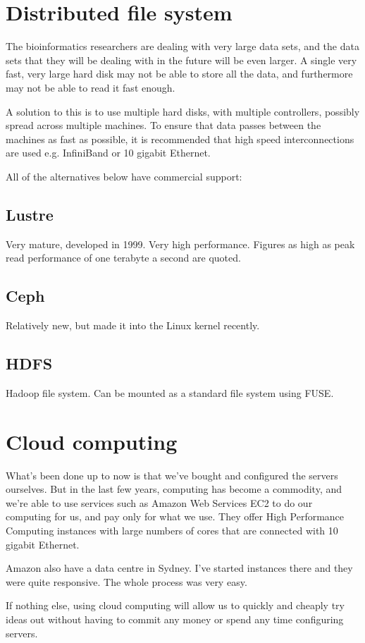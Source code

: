 \documentclass{amsart}
\begin{document}
\section{Distributed file system}
The bioinformatics researchers are dealing with very large data sets, and the data
sets that they will be dealing with in the future will be even larger. A single very
fast, very large hard disk may not be able to store all the data, and furthermore may
not be able to read it fast enough.

A solution to this is to use multiple hard disks, with multiple controllers, possibly
spread across multiple machines. To ensure that data passes between the machines as
fast as possible, it is recommended that high speed interconnections are used e.g.
InfiniBand or 10 gigabit Ethernet.

All of the alternatives below have commercial support:

\subsection{Lustre}
Very mature, developed in 1999. Very high performance. Figures as high as
peak read performance of one terabyte a second are quoted.
\subsection{Ceph}
Relatively new, but made it into the Linux kernel recently.
\subsection{HDFS}
Hadoop file system. Can be mounted as a standard file system using FUSE.

\section{Cloud computing}
What's been done up to now is that we've bought and configured the servers ourselves.
But in the last few years, computing has become a commodity, and we're able to use
services such as Amazon Web Services EC2 to do our computing for us, and pay only
for what we use. They offer High Performance Computing instances with large numbers
of cores that are connected with 10 gigabit Ethernet.

Amazon also have a data centre in Sydney. I've started instances there and they were 
quite responsive. The whole process was very easy.

If nothing else, using cloud computing will allow us to quickly and cheaply try
ideas out without having to commit any money or spend any time configuring servers.
\end{document}
